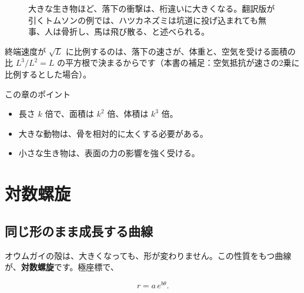 \documentclass[a4paper,11pt,openany]{ltjsbook}
\begin{document}
\begin{figure}[htbp]
\centering
{}
\caption{大きな生き物ほど、落下の衝撃は、桁違いに大きくなる。翻訳版が引くトムソンの例では、ハツカネズミは坑道に投げ込まれても無事、人は骨折し、馬は飛び散る、と述べられる。}
\end{figure}

終端速度が $\sqrt L$ に比例するのは、落下の速さが、体重と、空気を受ける面積の比 $L^3/L^2=L$ の平方根で決まるからです（本書の補足：空気抵抗が速さの2乗に比例するとした場合）。

\begin{pointbox}{この章のポイント}
\begin{itemize}[leftmargin=1.5em]
\item 長さ $k$ 倍で、面積は $k^2$ 倍、体積は $k^3$ 倍。
\item 大きな動物は、骨を相対的に太くする必要がある。
\item 小さな生き物は、表面の力の影響を強く受ける。
\end{itemize}
\end{pointbox}

\chapter{対数螺旋}

\section{同じ形のまま成長する曲線}

オウムガイの殻は、大きくなっても、形が変わりません。この性質をもつ曲線が、\textbf{対数螺旋}です。極座標で、

\[
r=a\,e^{b\theta}.
\]
\end{document}
